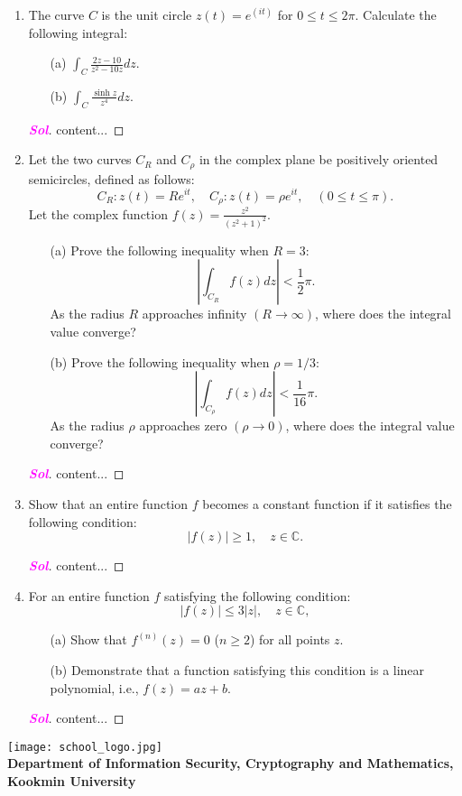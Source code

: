 \documentclass{article}
\newcommand{\footer}[1]{
	\begin{flushright}
		\vspace{2em}
		\texttt{[image: school\_logo.jpg]} \\
		\vspace{1em}
		\textcolor{blue2}{\small\textbf{#1}}
	\end{flushright}
}
\newcommand{\ie}{\textnormal{i.e.}}
\theoremstyle{definition}
\newcommand{\C}{\mathbb{C}}
\newcommand{\of}[1]{\left( #1 \right)}
\newcommand{\abs}[1]{\left\lvert #1 \right\rvert}
\newcommand{\sol}{\textcolor{magenta}{\bf Sol}}
\begin{document}
\begin{enumerate}
		\item The curve $C$ is the unit circle $z(t) = e^(it)$ for $0\leq t\leq 2\pi$. Calculate the following integral: \begin{enumerate}
			\item[(a)] $\displaystyle\int_C\frac{2z-10}{z^2-10z}dz$.
			\item[(b)] $\displaystyle\int_C\frac{\sinh z}{z^4}dz$.
		\end{enumerate}
		\begin{proof}[\sol]
			content...
		\end{proof}
		\vspace{8pt}
		\item Let the two curves $C_R$ and $C_\rho$ in the complex plane be positively oriented semicircles, defined as follows:
		\[
		C_R: z(t) = Re^{it},\quad  C_\rho: z(t) = \rho e^{it},\quad \of{0\leq t\leq\pi}.
		\] Let the complex function $\displaystyle f(z) = \frac{z^2}{\of{z^2+1}^2}$. \begin{enumerate}
			\item[(a)] Prove the following inequality when $R=3$: \[
			\abs{\int_{C_R}f\of{z}dz}<\frac{1}{2}\pi.
			\] As the radius $R$ approaches infinity $\of{R\to\infty}$, where does the integral value converge?
			\item[(b)] Prove the following inequality when $\rho = 1/3$:
			\[
			\abs{\int_{C_\rho}f\of{z}dz}<\frac{1}{16}\pi.
			\] As the radius $\rho$ approaches zero $\of{\rho\to 0}$, where does the integral value converge?
		\end{enumerate}
		\begin{proof}[\sol]
			content...
		\end{proof}
		\vspace{8pt}
		\item Show that an entire function $f$ becomes a constant function if it satisfies the following condition: \[
		\abs{f\of{z}}\geq 1,\quad z\in\C.
		\]
		\begin{proof}[\sol]
			content...
		\end{proof}
		\vspace{8pt}
		\item For an entire function $f$ satisfying the following condition: \[
		\abs{f\of{z}}\leq 3\abs{z},\quad z\in\C,
		\] \begin{enumerate}
			\item[(a)] Show that $f^{(n)}(z) = 0$ ($n\geq 2$) for all points $z$.
			\item[(b)] Demonstrate that a function satisfying this condition is a linear polynomial, \ie, $f(z) = az + b$.
		\end{enumerate}\begin{proof}[\sol]
			content...
		\end{proof}
	\end{enumerate}
	
	
	\footer{Department of Information Security, Cryptography and Mathematics, Kookmin University}
\end{document}
